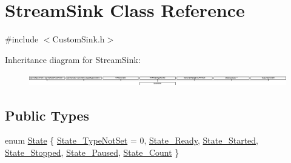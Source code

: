 \hypertarget{class_stream_sink}{}\section{Stream\+Sink Class Reference}
\label{class_stream_sink}


{\ttfamily \#include $<$Custom\+Sink.\+h$>$}

Inheritance diagram for Stream\+Sink\+:\begin{figure}[H]
\begin{center}
\leavevmode
\includegraphics[height=0.512821cm]{dc/df7/class_stream_sink}
\end{center}
\end{figure}
\subsection*{Public Types}
\begin{DoxyCompactItemize}
\item 
enum \hyperlink{class_stream_sink_acc9030ca2dc258ca0fa57ce0b34b9ddd}{State} \{ \newline
\hyperlink{class_stream_sink_acc9030ca2dc258ca0fa57ce0b34b9ddda2cfb5256d3958add898b780c17ebf538}{State\+\_\+\+Type\+Not\+Set} = 0, 
\hyperlink{class_stream_sink_acc9030ca2dc258ca0fa57ce0b34b9dddad57bbe1bfcc9af79b113cc7b4f25596e}{State\+\_\+\+Ready}, 
\hyperlink{class_stream_sink_acc9030ca2dc258ca0fa57ce0b34b9ddda08fed19ae965454043f866303231e84f}{State\+\_\+\+Started}, 
\hyperlink{class_stream_sink_acc9030ca2dc258ca0fa57ce0b34b9ddda9ba03b9fb4260e8ac78537c5e9269ea5}{State\+\_\+\+Stopped}, 
\newline
\hyperlink{class_stream_sink_acc9030ca2dc258ca0fa57ce0b34b9ddda726c7b07de39ccf925a7158013f3f586}{State\+\_\+\+Paused}, 
\hyperlink{class_stream_sink_acc9030ca2dc258ca0fa57ce0b34b9dddaaf2257f343d063c3a2c8ccd58cbe106f}{State\+\_\+\+Count}
 \}
\end{DoxyCompactItemize}
